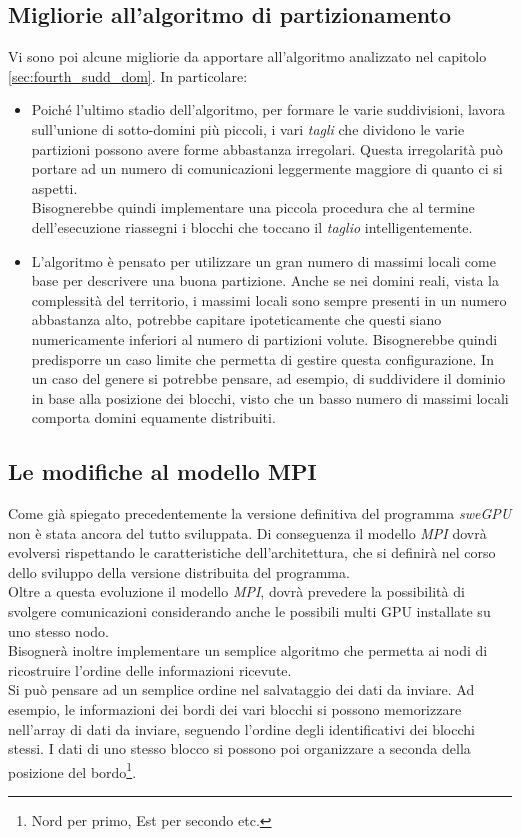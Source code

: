 \subsection*{Migliorie all'algoritmo di partizionamento}
Vi sono poi alcune migliorie da apportare all'algoritmo analizzato nel capitolo \ref{sec:fourth_sudd_dom}. In particolare:
\begin{itemize}
	\item Poiché l'ultimo stadio dell'algoritmo, per formare le varie suddivisioni, lavora sull'unione di sotto-domini più piccoli, i vari \textit{tagli} che dividono le varie partizioni possono avere forme abbastanza irregolari. Questa irregolarità può portare ad un numero di comunicazioni leggermente maggiore di quanto ci si aspetti.\\
	Bisognerebbe quindi implementare una piccola procedura che al termine dell'esecuzione riassegni i blocchi che toccano il \textit{taglio} intelligentemente.
	
	\item L'algoritmo è pensato per utilizzare un gran numero di massimi locali come base per descrivere una buona partizione. Anche se nei domini reali, vista la complessità del territorio, i massimi locali sono sempre presenti in un numero abbastanza alto, potrebbe capitare ipoteticamente che questi siano numericamente inferiori al numero di partizioni volute.
	Bisognerebbe quindi predisporre un caso limite che permetta di gestire questa configurazione.
	In un caso del genere si potrebbe pensare, ad esempio, di suddividere il dominio in base alla  posizione dei blocchi, visto che un basso numero di massimi locali comporta domini equamente distribuiti.
\end{itemize}

\subsection*{Le modifiche al modello MPI}
Come già spiegato precedentemente la versione definitiva del programma \textit{sweGPU} non è stata ancora del tutto sviluppata. Di conseguenza il modello \textit{MPI} dovrà evolversi rispettando le caratteristiche dell'architettura, che si definirà nel corso dello sviluppo della versione distribuita del programma.\\
Oltre a questa evoluzione il modello \textit{MPI}, dovrà prevedere la possibilità di svolgere comunicazioni considerando anche le possibili multi GPU installate su uno stesso nodo.\\
Bisognerà inoltre implementare un semplice algoritmo che permetta ai nodi di ricostruire l'ordine delle informazioni ricevute.\\
Si può pensare ad un semplice ordine nel salvataggio dei dati da inviare. Ad esempio, le informazioni dei bordi dei vari blocchi si possono memorizzare nell'array di dati da inviare, seguendo l'ordine degli identificativi dei blocchi stessi. I dati di uno stesso blocco si possono poi organizzare a seconda della posizione del bordo\footnote{Nord per primo, Est per secondo etc.}.